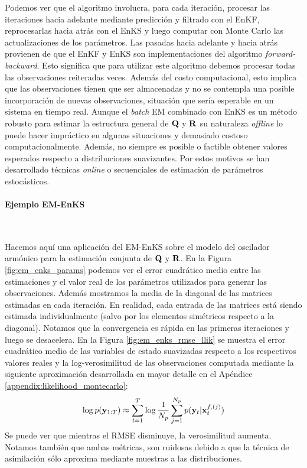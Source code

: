 Podemos ver que el algoritmo involucra, para cada iteración, procesar las iteraciones hacia adelante mediante predicción y filtrado con el EnKF, reprocesarlas hacia atrás con el EnKS y luego computar con Monte Carlo las actualizaciones de los parámetros. Las pasadas hacia adelante y hacia atrás provienen de que el EnKF y EnKS son implementaciones del algoritmo \textit{forward-backward}. Esto significa que para utilizar este algoritmo debemos procesar todas las observaciones reiteradas veces. Además del costo computacional, esto implica que las observaciones tienen que ser almacenadas y no se contempla una posible incorporación de nuevas observaciones, situación que sería esperable en un sistema en tiempo real. Aunque el \textit{batch} EM combinado con EnKS es un método robusto para estimar la estructura general de $\mathbf{Q}$ y $\mathbf{R}$ su naturaleza \textit{offline} lo puede hacer impráctico en algunas situaciones y demasiado costoso computacionalmente. Además, no siempre es posible o factible obtener valores esperados respecto a distribuciones suavizantes. Por estos motivos se han desarrollado técnicas \textit{online} o secuenciales de estimación de parámetros estocásticos. 

\paragraph{Ejemplo EM-EnKS} \

Hacemos aquí una aplicación del EM-EnKS sobre el modelo del oscilador armónico para la estimación conjunta de $\mathbf{Q}$ y $\mathbf{R}$. En la Figura \ref{fig:em_enks_params} podemos ver el error cuadrático medio entre las estimaciones y el valor real de los parámetros utilizados para generar las observaciones. Además mostramos la media de la diagonal de las matrices estimadas en cada iteración. En realidad, cada entrada de las matrices está siendo estimada individualmente (salvo por los elementos simétricos respecto a la diagonal). Notamos que la convergencia es rápida en las primeras iteraciones y luego se desacelera. En la Figura \ref{fig:em_enks_rmse_llik} se muestra el error cuadrático medio de las variables de estado suavizadas respecto a los respectivos valores reales y la log-verosimilitud de las observaciones computada mediante la siguiente aproximación desarrollada en mayor detalle en el Apéndice \ref{appendix:likelihood_montecarlo}:
\begin{align}
    \log p(\mathbf{y}_{1:T}) \approx \sum_{t=1}^{T} \log \frac{1}{N_p} \sum_{j=1}^{N_p} p(\mathbf{y}_t | \mathbf{x}_t^{f, (j)}) \label{eq:likelihood_montecarlo}
\end{align}
Se puede ver que mientras el RMSE disminuye, la verosimilitud aumenta. Notamos también que ambas métricas, son ruidosas debido a que la técnica de asimilación sólo aproxima mediante muestras a las distribuciones.

